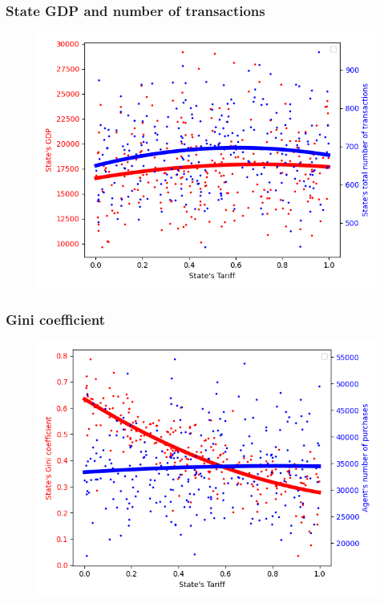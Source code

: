 {{        \subsubsection{State GDP and number of transactions}

        \begin{figure}
            \includegraphics[width=\linewidth]{img/exp/3_1.png}
        \end{figure} 
        { \lipsum[1-2] %
        \par

        \subsubsection{Gini coefficient}

        \begin{figure}
            \includegraphics[width=\linewidth]{img/exp/3_3.png}
        \end{figure} 
        { \lipsum[1-2] %
        \par


}}}}
